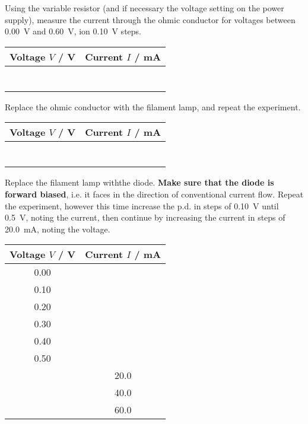 \begin{questions}
\question Using the variable resistor (and if necessary the voltage setting on the power supply), measure the current through  the ohmic conductor for voltages between \SI{0.00}{V} and \SI{0.60}{V}, ion \SI{0.10}{V} steps.

\begin{center}
\begin{tabular}{|c|c|}
\hline
Voltage $V$ / V & Current $I$ / mA\\
\hline 
& \\
\hline
& \\
\hline
& \\
\hline
& \\
\hline
& \\
\hline
& \\
\hline
& \\
\hline
\end{tabular}
\end{center}

\newpage

\question Replace the ohmic conductor with the filament lamp, and repeat the experiment.

\begin{center}
\begin{tabular}{|c|c|}
\hline
Voltage $V$ / V & Current $I$ / mA\\
\hline 
& \\
\hline
& \\
\hline
& \\
\hline
& \\
\hline
& \\
\hline
& \\
\hline
& \\
\hline
\end{tabular}
\end{center}


\question Replace the filament lamp withthe diode. \textbf{Make sure that the diode is forward biased}, i.e. it faces in the direction of conventional current flow.  Repeat the experiment, however this time increase the p.d. in steps of \SI{0.10}{V} until \SI{0.5}{V}, noting the current, then continue by increasing the current in steps of \SI{20.0}{mA}, noting the voltage.

\begin{center}
\begin{tabular}{|c|c|}
\hline
Voltage $V$ / V & Current $I$ / mA\\
\hline 
0.00 & \\
\hline
0.10 & \\
\hline
0.20 & \\
\hline
0.30 & \\
\hline
0.40 & \\
\hline
0.50 & \\
\hline
& 20.0\\
\hline
& 40.0\\
\hline
& 60.0\\
\hline
\end{tabular}
\end{center}


\end{questions}
